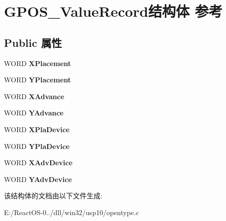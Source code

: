 \hypertarget{struct_g_p_o_s___value_record}{}\section{G\+P\+O\+S\+\_\+\+Value\+Record结构体 参考}
\label{struct_g_p_o_s___value_record}
\subsection*{Public 属性}
\begin{DoxyCompactItemize}
\item 
\mbox{\label{struct_g_p_o_s___value_record_a93e97301b1fe7188428fd264218ddaed}} 
W\+O\+RD {\bfseries X\+Placement}
\item 
\mbox{\label{struct_g_p_o_s___value_record_a72aa9ae664f29d05e7230880b805a3a8}} 
W\+O\+RD {\bfseries Y\+Placement}
\item 
\mbox{\label{struct_g_p_o_s___value_record_ab642057fe33b17a36388ba35d9af8d90}} 
W\+O\+RD {\bfseries X\+Advance}
\item 
\mbox{\label{struct_g_p_o_s___value_record_a20238748b175ed393315f45876101114}} 
W\+O\+RD {\bfseries Y\+Advance}
\item 
\mbox{\label{struct_g_p_o_s___value_record_aa85d3e0aab378c023bf3e6039971a725}} 
W\+O\+RD {\bfseries X\+Pla\+Device}
\item 
\mbox{\label{struct_g_p_o_s___value_record_ab5398b4134afa721a2af7ca11d15d47a}} 
W\+O\+RD {\bfseries Y\+Pla\+Device}
\item 
\mbox{\label{struct_g_p_o_s___value_record_aa21a8e6c2268bccd155abe7a3d0e8372}} 
W\+O\+RD {\bfseries X\+Adv\+Device}
\item 
\mbox{\label{struct_g_p_o_s___value_record_a05494b097239fdd111c467908ad3e860}} 
W\+O\+RD {\bfseries Y\+Adv\+Device}
\end{DoxyCompactItemize}


该结构体的文档由以下文件生成\+:\begin{DoxyCompactItemize}
\item 
E\+:/\+React\+O\+S-\/0../dll/win32/usp10/opentype.\+c\end{DoxyCompactItemize}
